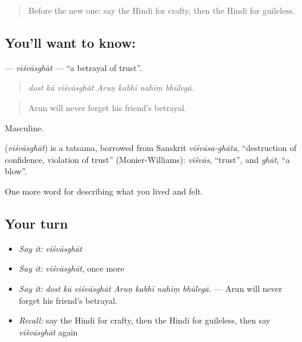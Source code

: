 \label{lesson:HI-C467-visvasghat}



\begin{quote}
Before the new one: say the Hindi for crafty, then the Hindi for guileless.
\end{quote}

\subsection*{You'll want to know: }
\textbf{} — \emph{viśvāsghāt} — \textquotedblleft{}a betrayal of trust\textquotedblright{}.

\begin{quote}
      
\end{quote}

\begin{quote}
\emph{dost kā viśvāsghāt Aruṇ kabhī nahīṃ bhūlegā.}
\end{quote}

\begin{quote}
Arun will never forget his friend's betrayal.
\end{quote}

Masculine.

\begin{cousinweb}
\textbf{} (\emph{viśvāsghāt}) is a tatsama, borrowed from Sanskrit \emph{viśvāsa-ghāta}, \textquotedblleft{}destruction of confidence, violation of trust\textquotedblright{} (Monier-Williams): \emph{viśvās}, \textquotedblleft{}trust\textquotedblright{}, and \emph{ghāt}, \textquotedblleft{}a blow\textquotedblright{}.
\end{cousinweb}

\begin{grammarlens}[title={What you've built}]
One more word for describing what you lived and felt.
\end{grammarlens}

\subsection*{Your turn}
\begin{itemize}
\raggedright
  \item \emph{Say it:} \emph{viśvāsghāt}
  \item \emph{Say it:} \emph{viśvāsghāt}, once more
  \item \emph{Say it:} \emph{dost kā viśvāsghāt Aruṇ kabhī nahīṃ bhūlegā.} — Arun will never forget his friend's betrayal.
  \item \emph{Recall:} say the Hindi for crafty, then the Hindi for guileless, then say \emph{viśvāsghāt} again
\end{itemize}

